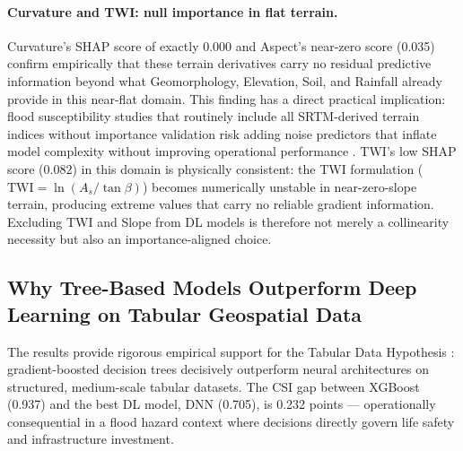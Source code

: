 \documentclass[12pt, a4paper]{article}
\begin{document}
\paragraph{Curvature and TWI: null importance in flat terrain.}
Curvature's SHAP score of exactly 0.000 and Aspect's near-zero score (0.035) confirm empirically that these terrain derivatives carry no residual predictive information beyond what Geomorphology, Elevation, Soil, and Rainfall already provide in this near-flat domain.  This finding has a direct practical implication: flood susceptibility studies that routinely include all SRTM-derived terrain indices without importance validation risk adding noise predictors that inflate model complexity without improving operational performance \citep{tehrany2019, khosravi2018}. TWI's low SHAP score (0.082) in this domain is physically consistent: the TWI formulation \mbox{($\text{TWI} = \ln(A_s/\tan\beta)$)} becomes numerically unstable in near-zero-slope terrain, producing extreme values that carry no reliable gradient information. Excluding TWI and Slope from DL models is therefore not merely a collinearity necessity but also an importance-aligned choice.

\subsection{Why Tree-Based Models Outperform Deep Learning on Tabular Geospatial Data}

The results provide rigorous empirical support for the Tabular Data Hypothesis \citep{grinsztajn2022, shwartzziv2022, mcelfresh2023}: gradient-boosted decision trees decisively outperform neural architectures on structured, medium-scale tabular datasets. The CSI gap between XGBoost (0.937) and the best DL model, DNN (0.705), is 0.232 points --- operationally consequential in a flood hazard context where decisions directly govern life safety and infrastructure investment.
\end{document}
